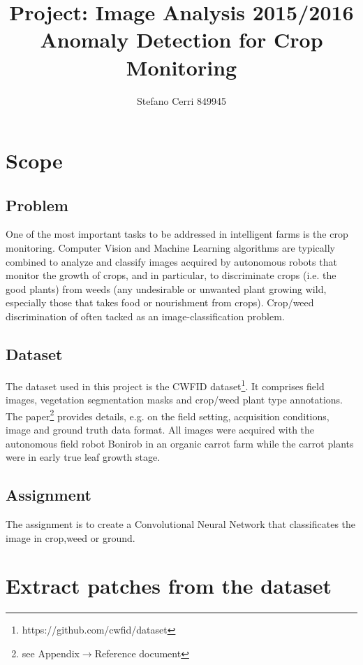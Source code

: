 \documentclass[]{report}
\title{Project: Image Analysis 2015/2016\\Anomaly Detection for Crop Monitoring}
\author{Stefano Cerri 849945}
\begin{document}
\maketitle
\tableofcontents
\listoffigures

\chapter{Scope}

\section{Problem}

One of the most important tasks to be addressed in intelligent farms is the crop monitoring. Computer Vision and Machine Learning algorithms are typically combined to analyze and classify images acquired by autonomous robots that monitor the growth of crops, and in particular, to discriminate crops (i.e. the good plants) from weeds (any undesirable or unwanted plant growing wild, especially those that takes food or nourishment from crops). Crop/weed discrimination of often tacked as an image-classification problem.


\section{Dataset}

The dataset used in this project is the CWFID dataset\footnote{https://github.com/cwfid/dataset}. It comprises field images, vegetation segmentation masks and crop/weed plant type annotations. The paper\footnote{see Appendix$\rightarrow  $Reference document} provides details, e.g. on the field setting, acquisition conditions, image and ground truth data format.
All images were acquired with the autonomous field robot Bonirob in an organic carrot farm while the carrot plants were in early true leaf growth stage.

\section{Assignment}

The assignment is to create a Convolutional Neural Network that classificates the image in crop,weed or ground. 

\chapter{Extract patches from the dataset}
\end{document}
